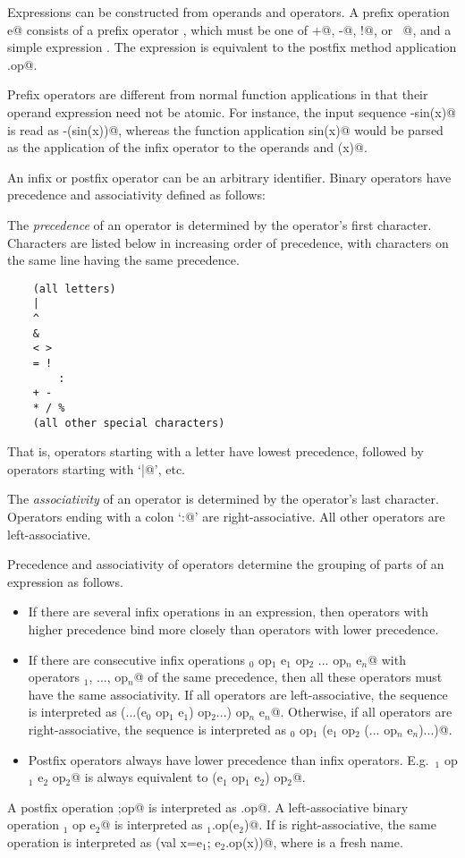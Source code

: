 \documentclass[11pt]{report}
\begin{document}
Expressions can be constructed from operands and operators.  A prefix
operation \verb@op e@ consists of a prefix operator \verb@op@, 
which must be one of \verb@+@, \verb@-@, \verb@!@, or \verb@~@,
and a simple expression \verb@e@.  The
expression is equivalent to the postfix method application \verb@e.op@.

Prefix operators are different from normal function applications in
that their operand expression need not be atomic. For instance, the
input sequence \verb@-sin(x)@ is read as \verb@-(sin(x))@, whereas the
function application \verb@negate sin(x)@ would be parsed as the
application of the infix operator \verb@sin@ to the operands
\verb@negate@ and \verb@(x)@.

An infix or postfix operator can be an arbitrary identifier. Binary
operators have precedence and associativity defined as follows:

The {\em precedence} of an operator is determined by the operator's first
character. Characters are listed below in increasing order of
precedence, with characters on the same line having the same precedence.
\begin{verbatim}
	(all letters)
	|
	^
	&
	< >
	= !
        :
	+ -
	* / %
	(all other special characters)
\end{verbatim}
That is, operators starting with a letter have lowest precedence,
followed by operators starting with `\verb@|@', etc.

The {\em associativity} of an operator is determined by the operator's
last character.  Operators ending with a colon `\verb@:@' are
right-associative. All other operators are left-associative.

Precedence and associativity of operators determine the grouping of
parts of an expression as follows.
\begin{itemize}
\item If there are several infix operations in an
expression, then operators with higher precedence bind more closely
than operators with lower precedence.
\item If there are consecutive infix
operations \verb@e$_0$ op$_1$ e$_1$ op$_2$ ... op$_n$ e$_n$@ 
with operators \verb@op$_1$, ..., op$_n$@ of the same precedence, 
then all these operators must
have the same associativity. If all operators are left-associative,
the sequence is interpreted as
\verb@(...(e$_0$ op$_1$ e$_1$) op$_2$...) op$_n$ e$_n$@. 
Otherwise, if all operators are right-associative, the
sequence is interpreted as
\verb@e$_0$ op$_1$ (e$_1$ op$_2$ (... op$_n$ e$_n$)...)@.
\item
Postfix operators always have lower precedence than infix
operators. E.g.\ \verb@e$_1$ op$_1$ e$_2$ op$_2$@ is always equivalent to
\verb@(e$_1$ op$_1$ e$_2$) op$_2$@.
\end{itemize}
A postfix operation \verb@e;op@ is interpreted as \verb@e.op@. A
left-associative binary operation \verb@e$_1$ op e$_2$@ is interpreted as
\verb@e$_1$.op(e$_2$)@. If \verb@op@ is right-associative, the same operation is
interpreted as \verb@(val x=e$_1$; e$_2$.op(x))@, 
where \verb@x@ is a fresh name.
\end{document}

